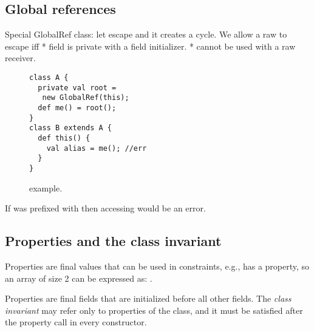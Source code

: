 \subsection{Global references}
Special GlobalRef class: let \this escape and it creates a cycle.
We allow a raw \this to escape iff
* field is private with a field initializer.
* cannot be used with a raw \this receiver.

\begin{figure}
\begin{lstlisting}
class A {
  private val root =
   new GlobalRef(this);
  def me() = root();
}
class B extends A {
  def this() {
    val alias = me(); //err
  }
}
\end{lstlisting}
\caption{ example.
    }
\label{Figure:GlobalRef}
\end{figure}

If  was prefixed with
then accessing  would be an error.



\subsection{Properties and the class invariant}
Properties are final values that can be used in constraints,
    e.g.,  has a  property,
    so an array of size 2 can be expressed as: .

Properties are final fields that are initialized before all other fields.
The \emph{class invariant} may refer only to properties of the class,
    and it must be satisfied after the property call in every constructor.


